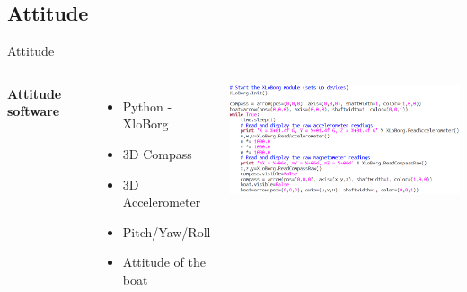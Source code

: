 \documentclass[aspectratio=169,unknownkeysallowed,xcolor=dvipsnames,beamer]{beamer} %
\begin{document}
\subsection{Attitude}
\begin{frame}[fragile]{Attitude}
\begin{columns}
\textbf{Attitude software}
\vspace{5mm}
\begin{itemize}
 \item Python - XloBorg 
 \item 3D Compass
 \item 3D Accelerometer
 \item Pitch/Yaw/Roll
 \item Attitude of the boat
 \end{itemize}
\begin{center}
 \includegraphics[width=10cm]{attitude_py}
\end{center}
\end{columns}
\end{frame}

{
\begin{frame}[plain]
\end{frame}}
\end{document}
